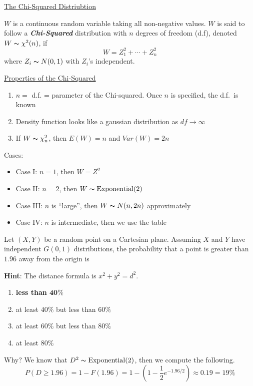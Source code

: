 \underline{The Chi-Squared Distriubtion}
\begin{defbox}
    \begin{definition}
        $ W $ is a continuous random variable taking all non-negative values.
        $ W $ is said to follow a \textbf{\emph{Chi-Squared}} distribution
        with $ n $ degrees of freedom (d.f), denoted $ W \thicksim \chi^2(n) $,
        if
        \[ W=Z_1^2+\cdots+Z_n^2 \]
        where $ Z_i \thicksim N(0,1) $ with $ Z_i $'s independent.
    \end{definition}
\end{defbox}
\underline{Properties of the Chi-Squared}
\begin{enumerate}[label=(\roman*)]
    \item $ n= $ d.f. = parameter of the Chi-squared. Once $ n $ is specified, the d.f.\ is known
    \item Density function looks like a gaussian distribution as $ df\rightarrow\infty $
    \item If $ W \thicksim \chi^2_n $, then $ E(W)=n $ and $ Var(W)=2n $
\end{enumerate}
Cases:
\begin{itemize}
    \item Case I\@: $ n=1 $, then $ W=Z^2 $
    \item Case II\@: $ n=2 $, then $ W \thicksim \operatorname{Exponential}(2) $
    \item Case III\@: $ n $ is ``large'', then $ W \thicksim N(n,2n) $ approximately
    \item Case IV\@: $ n $ is intermediate, then we use the table
\end{itemize}

Let $ (X,Y) $ be a random point on a Cartesian plane. Assuming $ X $ and $ Y $
have independent $ G(0,1) $ distributions, the probability that a point is greater
than $ 1.96 $ away from the origin is

\textbf{Hint}: The distance formula is $ x^2+y^2=d^2 $.
\begin{enumerate}[label=(\Alph*)]
    \item \textbf{less than $ \bm{40\%} $}
    \item at least $ 40\% $ but less than $ 60\% $
    \item at least $ 60\% $ but less than $ 80\% $
    \item at least $ 80\% $
\end{enumerate}
Why? We know that $ D^2 \thicksim \operatorname{Exponential}(2) $, then we compute the following.
\[ P(D\geqslant 1.96)=1-F(1.96)=1-\left( 1-\frac{1}{2} e^{-1.96/2} \right)\approx 0.19=19\% \]

